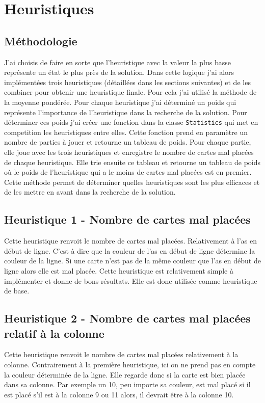 \chapter{Heuristiques}

\section{Méthodologie}
J'ai choisis de faire en sorte que l'heuristique avec la valeur la plus basse représente un état le plus près de la solution. Dans cette logique j'ai alors implémentées trois heuristiques (détaillées dans les sections suivantes) et de les combiner pour obtenir une heuristique finale. Pour cela j'ai utilisé la méthode de la moyenne pondérée. Pour chaque heuristique j'ai déterminé un poids qui représente l'importance de l'heuristique dans la recherche de la solution. Pour déterminer ces poids j'ai créer une fonction dans la classe \texttt{Statistics} qui met en competition les heuristiques entre elles. Cette fonction prend en paramètre un nombre de parties à jouer et retourne un tableau de poids. Pour chaque partie, elle joue avec les trois heuristiques et enregistre le nombre de cartes mal placées de chaque heuristique. Elle trie ensuite ce tableau et retourne un tableau de poids où le poids de l'heuristique qui a le moins de cartes mal placées est en premier. Cette méthode permet de déterminer quelles heuristiques sont les plus efficaces et de les mettre en avant dans la recherche de la solution.

\section{Heuristique 1 - Nombre de cartes mal placées}
Cette heuristique renvoit le nombre de cartes mal placées. Relativement à l'as en début de ligne. C'est à dire que la couleur de l'as en début de ligne détermine la couleur de la ligne. Si une carte n'est pas de la même couleur que l'as en début de ligne alors elle est mal placée. Cette heuristique est relativement simple à implémenter et donne de bons résultats. Elle est donc utilisée comme heuristique de base.

\pagebreak

\section{Heuristique 2 - Nombre de cartes mal placées relatif à la colonne}
Cette heuristique renvoit le nombre de cartes mal placées relativement à la colonne. Contrairement à la première heuristique, ici on ne prend pas en compte la couleur déterminée de la ligne. Elle regarde donc si la carte est bien placée dans sa colonne. Par exemple un 10, peu importe sa couleur, est mal placé si il est placé s'il est à la colonne 9 ou 11 alors, il devrait être à la colonne 10.

